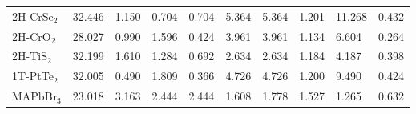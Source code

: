 \begin{center}
\begin{tabularx}{1.1\linewidth}{lXXXXXXXXX}
    2H-CrSe$_{2}$ & 32.446  & 1.150  & 0.704  & 0.704  & 5.364  & 5.364  & 1.201  & 11.268  & 0.432 \\
    2H-CrO$_{2}$ & 28.027  & 0.990  & 1.596  & 0.424  & 3.961  & 3.961  & 1.134  & 6.604  & 0.264 \\
    2H-TiS$_{2}$ & 32.199  & 1.610  & 1.284  & 0.692  & 2.634  & 2.634  & 1.184  & 4.187  & 0.398 \\
    1T-PtTe$_{2}$ & 32.005  & 0.490  & 1.809  & 0.366  & 4.726  & 4.726  & 1.200  & 9.490  & 0.424 \\
    MAPbBr$_{3}$ & 23.018 & 3.163 & 2.444 & 2.444 & 1.608 & 1.778 & 1.527 & 1.265 & 0.632 \\
    \hline
  \end{tabularx}

\end{center}
% 
